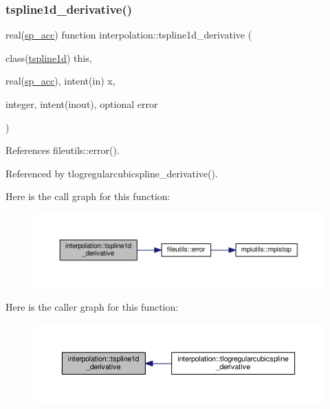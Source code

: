 \subsubsection{\texorpdfstring{tspline1d\+\_\+derivative()}{tspline1d\_derivative()}}
{\footnotesize\ttfamily real(\mbox{\hyperlink{namespaceinterpolation_af72aa9a05feb8ef90b2d26e4a013abf3}{sp\+\_\+acc}}) function interpolation\+::tspline1d\+\_\+derivative (\begin{DoxyParamCaption}\item[{class(\mbox{\hyperlink{structinterpolation_1_1tspline1d}{tspline1d}})}]{this,  }\item[{real(\mbox{\hyperlink{namespaceinterpolation_af72aa9a05feb8ef90b2d26e4a013abf3}{sp\+\_\+acc}}), intent(in)}]{x,  }\item[{integer, intent(inout), optional}]{error }\end{DoxyParamCaption})}



References fileutils\+::error().



Referenced by tlogregularcubicspline\+\_\+derivative().

Here is the call graph for this function\+:
\nopagebreak
\begin{figure}[H]
\begin{center}
\leavevmode
\includegraphics[width=350pt]{namespaceinterpolation_aec275a9deb7e4578d9d8c310b0dea093_cgraph}
\end{center}
\end{figure}
Here is the caller graph for this function\+:
\nopagebreak
\begin{figure}[H]
\begin{center}
\leavevmode
\includegraphics[width=350pt]{namespaceinterpolation_aec275a9deb7e4578d9d8c310b0dea093_icgraph}
\end{center}
\end{figure}
\mbox{\label{namespaceinterpolation_a54d9bd9ab88b402805329a4dbad1bc3d}} 
